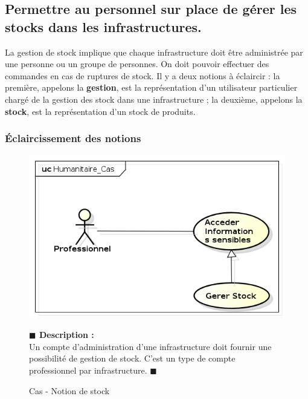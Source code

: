 \documentclass[11pt, titlepage]{report}
\newcommand{\debutDescription}{\noindent\textbf{\textcolor{DescriptionColor}{$\blacksquare$  Description : \\}}}
\newcommand{\finDescription}{\noindent\textcolor{DescriptionColor}{$\blacksquare$}}
\begin{document}
\subsection{Permettre au personnel sur place de gérer les stocks dans les infrastructures.}
La gestion de stock implique que chaque infrastructure doit être administrée par une personne ou un groupe de personnes. On doit pouvoir effectuer des commandes en cas de ruptures de stock. Il y a deux notions à éclaircir : la première, appelons la \textbf{gestion},  est la représentation d'un utilisateur particulier chargé de la gestion des stock dans une infrastructure ; la deuxième, appelons la \textbf{stock}, est la représentation d'un stock de produits.
\subsubsection{Éclaircissement des notions}
\begin{figure}[h!]
\begin{center}
\includegraphics[scale=.4]{../images/diagrammes/uml/exigence_4/cas_exigence_4.png} 
\caption{Cas - Notion de stock}
\end{center}
\debutDescription
Un compte d'administration d'une infrastructure doit fournir une possibilité de gestion de stock. C'est un type de compte professionnel par infrastructure.
\finDescription
\end{figure}
\end{document}
